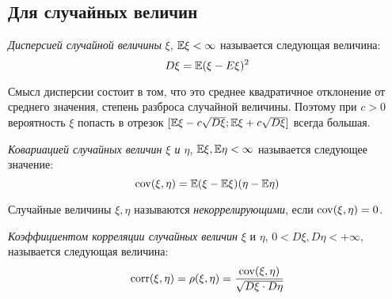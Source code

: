 \subsection{Для случайных величин}

\begin{definition}
	\textit{Дисперсией случайной величины} $\xi$, $\mathbb{E}\xi < \infty$ называется следующая величина:
	\[
		D\xi = \mathbb{E}(\xi - E\xi)^2
	\]
\end{definition}

\begin{note}
	Смысл дисперсии состоит в том, что это среднее квадратичное отклонение от среднего значения, степень разброса случайной величины. Поэтому при $c > 0$ вероятность $\xi$ попасть в отрезок $[\mathbb{E}\xi - c\sqrt{D\xi}; \mathbb{E}\xi + c\sqrt{D\xi}]$ всегда большая.
\end{note}

\begin{definition}
	\textit{Ковариацией случайных величин $\xi$ и $\eta$}, $\mathbb{E}\xi, \mathbb{E}\eta < \infty$ называется следующее значение:
	\[
		\operatorname{cov}(\xi, \eta) = \mathbb{E}(\xi - \mathbb{E}\xi)(\eta - \mathbb{E}\eta)
	\]
\end{definition}

\begin{definition}
	Случайные величины $\xi, \eta$ называются \textit{некоррелирующими}, если $\operatorname{cov}(\xi, \eta) = 0$.
\end{definition}

\begin{definition}
	\textit{Коэффициентом корреляции случайных величин} $\xi$ и $\eta$, $0 < D\xi, D\eta < +\infty$, называется следующая величина:
	\[
		\operatorname{corr}(\xi, \eta) = \rho(\xi, \eta) = \frac{\operatorname{cov}(\xi, \eta)}{\sqrt{D\xi \cdot D\eta}}
	\]
\end{definition}